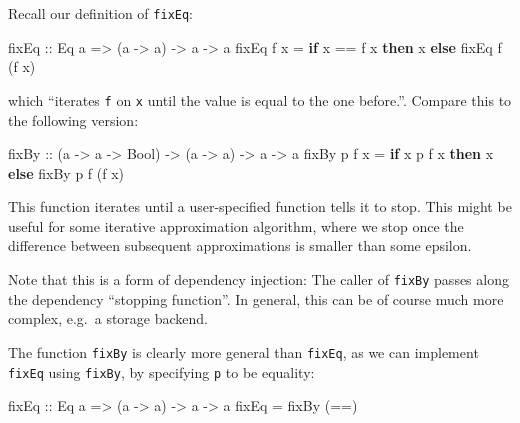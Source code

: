 \documentclass[11pt,
  american,
  DIV13]{article}
\newenvironment{Shaded}{}{}
\newcommand{\DataTypeTok}[1]{\textcolor[rgb]{0.56,0.13,0.00}{#1}}
\newcommand{\KeywordTok}[1]{\textcolor[rgb]{0.00,0.44,0.13}{\textbf{#1}}}
\newcommand{\NormalTok}[1]{#1}
\newcommand{\OperatorTok}[1]{\textcolor[rgb]{0.40,0.40,0.40}{#1}}
\newcommand{\OtherTok}[1]{\textcolor[rgb]{0.00,0.44,0.13}{#1}}
\begin{document}
Recall our definition of \texttt{fixEq}:

\begin{Shaded}
\begin{Highlighting}[]
\OtherTok{fixEq ::} \DataTypeTok{Eq}\NormalTok{ a }\OtherTok{=\textgreater{}}\NormalTok{ (a }\OtherTok{{-}\textgreater{}}\NormalTok{ a) }\OtherTok{{-}\textgreater{}}\NormalTok{ a }\OtherTok{{-}\textgreater{}}\NormalTok{ a}
\NormalTok{fixEq f x }\OtherTok{=} \KeywordTok{if}\NormalTok{ x }\OperatorTok{==}\NormalTok{ f x }\KeywordTok{then}\NormalTok{ x }\KeywordTok{else}\NormalTok{ fixEq f (f x)}
\end{Highlighting}
\end{Shaded}

which ``iterates \texttt{f} on \texttt{x} until the value is equal to
the one before.''. Compare this to the following version:

\begin{Shaded}
\begin{Highlighting}[]
\OtherTok{fixBy ::}\NormalTok{ (a }\OtherTok{{-}\textgreater{}}\NormalTok{ a }\OtherTok{{-}\textgreater{}} \DataTypeTok{Bool}\NormalTok{) }\OtherTok{{-}\textgreater{}}\NormalTok{ (a }\OtherTok{{-}\textgreater{}}\NormalTok{ a) }\OtherTok{{-}\textgreater{}}\NormalTok{ a }\OtherTok{{-}\textgreater{}}\NormalTok{ a}
\NormalTok{fixBy p f x }\OtherTok{=} \KeywordTok{if}\NormalTok{ x }\OtherTok{\textasciigrave{}p\textasciigrave{}}\NormalTok{ f x }\KeywordTok{then}\NormalTok{ x }\KeywordTok{else}\NormalTok{ fixBy p f (f x)}
\end{Highlighting}
\end{Shaded}

This function iterates until a user-specified function tells it to stop.
This might be useful for some iterative approximation algorithm, where
we stop once the difference between subsequent approximations is smaller
than some epsilon.

Note that this is a form of dependency injection: The caller of
\texttt{fixBy} passes along the dependency ``stopping function''. In
general, this can be of course much more complex, e.g.~a storage
backend.

The function \texttt{fixBy} is clearly more general than \texttt{fixEq},
as we can implement \texttt{fixEq} using \texttt{fixBy}, by specifying
\texttt{p} to be equality:

\begin{Shaded}
\begin{Highlighting}[]
\OtherTok{fixEq ::} \DataTypeTok{Eq}\NormalTok{ a }\OtherTok{=\textgreater{}}\NormalTok{ (a }\OtherTok{{-}\textgreater{}}\NormalTok{ a) }\OtherTok{{-}\textgreater{}}\NormalTok{ a }\OtherTok{{-}\textgreater{}}\NormalTok{ a}
\NormalTok{fixEq }\OtherTok{=}\NormalTok{ fixBy (}\OperatorTok{==}\NormalTok{)}
\end{Highlighting}
\end{Shaded}
\end{document}
